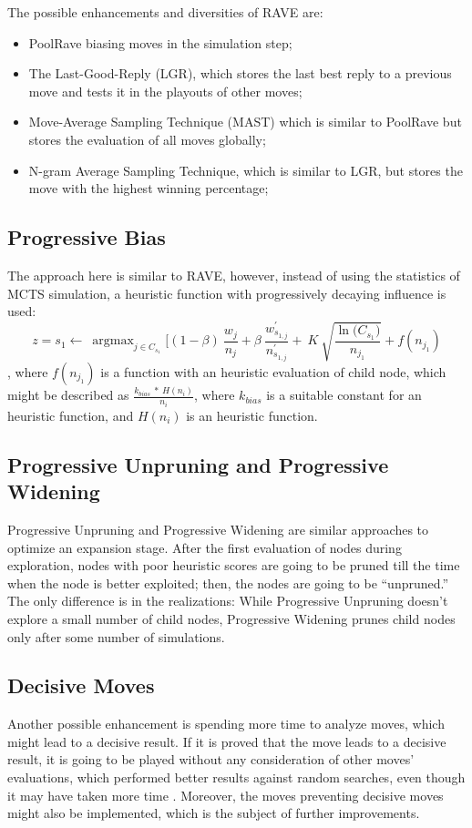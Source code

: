 \documentclass[paper=8.27in:11.69in]{scrartcl}
\DeclareMathOperator*{\argmax}{argmax}
\begin{document}
The possible enhancements and diversities of RAVE are:\\
\begin{itemize}

\item PoolRave biasing moves in the simulation step;
\item The Last-Good-Reply (LGR), which stores the last best reply to a previous move and tests it in the playouts of other moves;
\item Move-Average Sampling Technique (MAST) which is similar to PoolRave but stores the evaluation of all moves globally;
\item N-gram Average Sampling Technique, which is similar to LGR, but stores the move with the highest winning percentage;
\end{itemize}
\subsection{Progressive Bias}
The approach here is similar to RAVE, however, instead of using the statistics of MCTS simulation, a heuristic function with progressively decaying influence is used:
\[z = {s}_{1} \leftarrow \ \argmax_{j \in C_{s_{1}}} [(1 - \beta ) \ \frac{{w}_{j}}{{n}_{j}} + \beta \ {\frac{{w^{'}_{s_{1,j}}}}{n^{'}_{s_{1,j}}}} + \ K \ \sqrt{\frac{\ln({C_{s_{1}})}}{n_{j_{1}}}} + f({n_{j_{1}}})\],
where $ f({n_{j_{1}}}) $ is a function with an heuristic evaluation of child node, which might be described as $ \frac{k_{bias}  \ * \ H(n_{i})}{n_{i}} $, where $ {k_{bias}} $ is a suitable constant for an heuristic function, and $ H(n_{i}) $ is an heuristic function.\\
\subsection{Progressive Unpruning and Progressive Widening}
Progressive Unpruning \cite{Chaslot2008ProgressiveSF} and Progressive Widening \cite{Coulom2007ComputingR} are similar approaches to optimize an expansion stage. After the first evaluation of nodes during exploration, nodes with poor heuristic scores are going to be pruned till the time when the node is better exploited; then, the nodes are going to be “unpruned.” The only difference is in the realizations: While Progressive Unpruning doesn’t explore a small number of child nodes, Progressive Widening prunes child nodes only after some number of simulations.\\
\subsection{Decisive Moves}
Another possible enhancement is spending more time to analyze moves, which might lead to a decisive result. If it is proved that the move leads to a decisive result, it is going to be played without any consideration of other moves’ evaluations, which performed better results against random searches, even though it may have taken more time \cite{Teytaud2010OnTH}. Moreover, the moves preventing decisive moves might also be implemented, which is the subject of further improvements.\\
\end{document}
